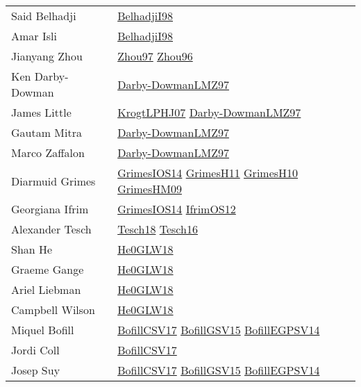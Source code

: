 {\begin{longtable}{p{4cm}p{15cm}}
Said Belhadji & \href{articles/BelhadjiI98.pdf}{BelhadjiI98}\cite{BelhadjiI98} \\
Amar Isli & \href{articles/BelhadjiI98.pdf}{BelhadjiI98}\cite{BelhadjiI98} \\
Jianyang Zhou & \href{articles/Zhou97.pdf}{Zhou97}\cite{Zhou97} \href{papers/Zhou96.pdf}{Zhou96}\cite{Zhou96} \\
Ken Darby{-}Dowman & \href{articles/Darby-DowmanLMZ97.pdf}{Darby-DowmanLMZ97}\cite{Darby-DowmanLMZ97} \\
James Little & \href{papers/KrogtLPHJ07.pdf}{KrogtLPHJ07}\cite{KrogtLPHJ07} \href{articles/Darby-DowmanLMZ97.pdf}{Darby-DowmanLMZ97}\cite{Darby-DowmanLMZ97} \\
Gautam Mitra & \href{articles/Darby-DowmanLMZ97.pdf}{Darby-DowmanLMZ97}\cite{Darby-DowmanLMZ97} \\
Marco Zaffalon & \href{articles/Darby-DowmanLMZ97.pdf}{Darby-DowmanLMZ97}\cite{Darby-DowmanLMZ97} \\
Diarmuid Grimes & \href{articles/GrimesIOS14.pdf}{GrimesIOS14}\cite{GrimesIOS14} \href{papers/GrimesH11.pdf}{GrimesH11}\cite{GrimesH11} \href{papers/GrimesH10.pdf}{GrimesH10}\cite{GrimesH10} \href{papers/GrimesHM09.pdf}{GrimesHM09}\cite{GrimesHM09} \\
Georgiana Ifrim & \href{articles/GrimesIOS14.pdf}{GrimesIOS14}\cite{GrimesIOS14} \href{papers/IfrimOS12.pdf}{IfrimOS12}\cite{IfrimOS12} \\
Alexander Tesch & \href{papers/Tesch18.pdf}{Tesch18}\cite{Tesch18} \href{papers/Tesch16.pdf}{Tesch16}\cite{Tesch16} \\
Shan He & \href{papers/He0GLW18.pdf}{He0GLW18}\cite{He0GLW18} \\
Graeme Gange & \href{papers/He0GLW18.pdf}{He0GLW18}\cite{He0GLW18} \\
Ariel Liebman & \href{papers/He0GLW18.pdf}{He0GLW18}\cite{He0GLW18} \\
Campbell Wilson & \href{papers/He0GLW18.pdf}{He0GLW18}\cite{He0GLW18} \\
Miquel Bofill & \href{papers/BofillCSV17.pdf}{BofillCSV17}\cite{BofillCSV17} \href{papers/BofillGSV15.pdf}{BofillGSV15}\cite{BofillGSV15} \href{papers/BofillEGPSV14.pdf}{BofillEGPSV14}\cite{BofillEGPSV14} \\
Jordi Coll & \href{papers/BofillCSV17.pdf}{BofillCSV17}\cite{BofillCSV17} \\
Josep Suy & \href{papers/BofillCSV17.pdf}{BofillCSV17}\cite{BofillCSV17} \href{papers/BofillGSV15.pdf}{BofillGSV15}\cite{BofillGSV15} \href{papers/BofillEGPSV14.pdf}{BofillEGPSV14}\cite{BofillEGPSV14} \\

\end{longtable}}
